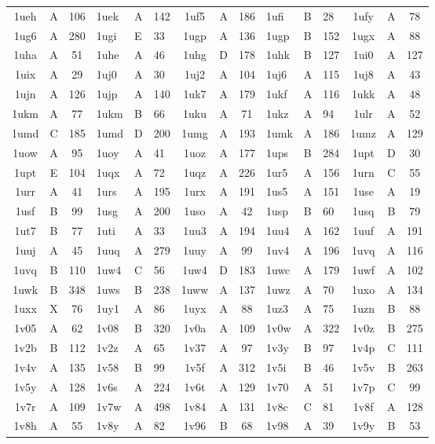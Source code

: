 \begin{longtable}{|c|c|c| a|a|a| c|c|c| a|a|a| c|c|c|}
1ueh & A & 106 & 1uek & A & 142 & 1uf5 & A & 186 & 1ufi & B & 28 & 1ufy & A & 78\\
1ug6 & A & 280 & 1ugi & E & 33 & 1ugp & A & 136 & 1ugp & B & 152 & 1ugx & A & 88\\
1uha & A & 51 & 1uhe & A & 46 & 1uhg & D & 178 & 1uhk & B & 127 & 1ui0 & A & 127\\
1uix & A & 29 & 1uj0 & A & 30 & 1uj2 & A & 104 & 1uj6 & A & 115 & 1uj8 & A & 43\\
1ujn & A & 126 & 1ujp & A & 140 & 1uk7 & A & 179 & 1ukf & A & 116 & 1ukk & A & 48\\
1ukm & A & 77 & 1ukm & B & 66 & 1uku & A & 71 & 1ukz & A & 94 & 1ulr & A & 52\\
1umd & C & 185 & 1umd & D & 200 & 1umg & A & 193 & 1umk & A & 186 & 1umz & A & 129\\
1uow & A & 95 & 1uoy & A & 41 & 1uoz & A & 177 & 1ups & B & 284 & 1upt & D & 30\\
1upt & E & 104 & 1uqx & A & 72 & 1uqz & A & 226 & 1ur5 & A & 156 & 1urn & C & 55\\
1urr & A & 41 & 1urs & A & 195 & 1urx & A & 191 & 1us5 & A & 151 & 1use & A & 19\\
1usf & B & 99 & 1usg & A & 200 & 1uso & A & 42 & 1usp & B & 60 & 1usq & B & 79\\
1ut7 & B & 77 & 1uti & A & 33 & 1uu3 & A & 194 & 1uu4 & A & 162 & 1uuf & A & 191\\
1uuj & A & 45 & 1uuq & A & 279 & 1uuy & A & 99 & 1uv4 & A & 196 & 1uvq & A & 116\\
1uvq & B & 110 & 1uw4 & C & 56 & 1uw4 & D & 183 & 1uwc & A & 179 & 1uwf & A & 102\\
1uwk & B & 348 & 1uws & B & 238 & 1uww & A & 137 & 1uwz & A & 70 & 1uxo & A & 134\\
1uxx & X & 76 & 1uy1 & A & 86 & 1uyx & A & 88 & 1uz3 & A & 75 & 1uzn & B & 88\\
1v05 & A & 62 & 1v08 & B & 320 & 1v0a & A & 109 & 1v0w & A & 322 & 1v0z & B & 275\\
1v2b & B & 112 & 1v2z & A & 65 & 1v37 & A & 97 & 1v3y & B & 97 & 1v4p & C & 111\\
1v4v & A & 135 & 1v58 & B & 99 & 1v5f & A & 312 & 1v5i & B & 46 & 1v5v & B & 263\\
1v5y & A & 128 & 1v6s & A & 224 & 1v6t & A & 129 & 1v70 & A & 51 & 1v7p & C & 99\\
1v7r & A & 109 & 1v7w & A & 498 & 1v84 & A & 131 & 1v8c & C & 81 & 1v8f & A & 128\\
1v8h & A & 55 & 1v8y & A & 82 & 1v96 & B & 68 & 1v98 & A & 39 & 1v9y & B & 53\\

\end{longtable}
